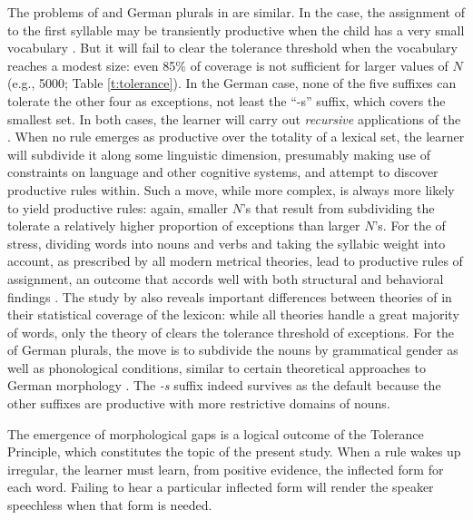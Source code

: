 \documentclass[output=paper,
modfonts
]{LSP/langsci}
\begin{document}
The problems of   and German plurals in  are
similar. In the  case,  the assignment of  to the first
syllable may be transiently productive when the child has a very small
vocabulary \citep{Kehoe1997a, LY2013}. But it will fail to clear the tolerance
threshold when the vocabulary reaches a modest size:  even 85\% of
coverage is not sufficient for larger values of $N$ (e.g., 5000;  Table 
\ref{t:tolerance}). In the German case, none of the five 
suffixes can tolerate the other four as exceptions, not least the
``-s'' suffix,  which covers the smallest set. In both cases, the
learner will carry out \textit{recursive} 
applications of the . When  no rule emerges as
productive over the totality of a lexical set, the learner will
subdivide it along some linguistic dimension, presumably making use of 
constraints on language and other cognitive systems,  and attempt
to discover productive rules within. Such a move, while more complex, 
is always more likely to yield productive rules: again, smaller $N$'s
that result from subdividing the  tolerate a relatively higher
proportion of exceptions than larger $N$'s.  For the  of
stress, dividing words into nouns and verbs and taking the syllabic
weight into account, as prescribed by all modern metrical theories, 
lead to productive rules of  assignment, an outcome that accords
well with both structural and behavioral findings 
\citep{Ladefoged1968, Baker1976, Kelly1992, Guion2003}. The study by
\citet{LY2013} also reveals important differences between theories of
 in their statistical
coverage  of the  lexicon: while all theories handle a great
majority of  words, only the theory of \citealt{Halle1998}
clears the tolerance threshold of exceptions.  For the  of German
plurals, the move is to subdivide the nouns by grammatical gender as
well as phonological conditions, similar to certain theoretical
approaches to German morphology \citep[e.g.,][]{Wiese1996}. The \textit{-s} suffix indeed survives as the default because the other suffixes
are productive with more restrictive domains of nouns.  

The emergence of  morphological gaps is a logical outcome of the Tolerance
Principle, which constitutes the topic of the present study. When a
rule wakes up irregular, the learner must learn, from positive
evidence, the inflected form for each word. Failing to hear a particular inflected form  
will render the speaker  speechless when that
form is needed. 
\end{document}
